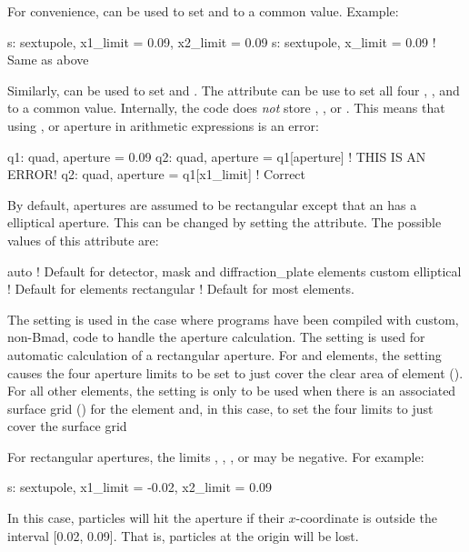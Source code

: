 For convenience,  can be used to set  and
 to a common value. Example:
\begin{example}
  s: sextupole, x1_limit = 0.09, x2_limit = 0.09
  s: sextupole, x_limit = 0.09   ! Same as above
\end{example}
Similarly,  can be used
to set  and .  The  attribute
can be use to set all four , , 
and  to a common value. Internally, the \bmad code does {\em not}
store , , or . This means that
using ,  or aperture in arithmetic expressions is
an error:
\begin{example}
  q1: quad, aperture = 0.09         
  q2: quad, aperture = q1[aperture]   ! THIS IS AN ERROR!
  q2: quad, aperture = q1[x1_limit]   ! Correct
\end{example}

By default, apertures are assumed to be rectangular except that an
 has a elliptical aperture. This can be changed by
setting the  attribute. The possible values of this
attribute are:
\begin{example}
  auto         ! Default for detector, mask and diffraction_plate elements
  custom
  elliptical   ! Default for  elements
  rectangular  ! Default for most elements.
\end{example}
The  setting is used in the case where programs have been
compiled with custom, non-Bmad, code to handle the aperture
calculation.  The  setting is used for automatic calculation
of a rectangular aperture. For  and 
elements, the  setting causes the four aperture limits to be
set to just cover the clear area of element
(). For all other elements, the 
setting is only to be used when there is an associated surface grid
() for the element and, in this case, \bmad to set
the four limits to just cover the surface grid

For rectangular apertures, the limits , ,
, or  may be negative. For example:
\begin{example}
  s: sextupole, x1_limit = -0.02, x2_limit = 0.09
\end{example}
In this case, particles will hit the aperture if their $x$-coordinate
is outside the interval [0.02, 0.09]. That is, particles at the origin
will be lost.

